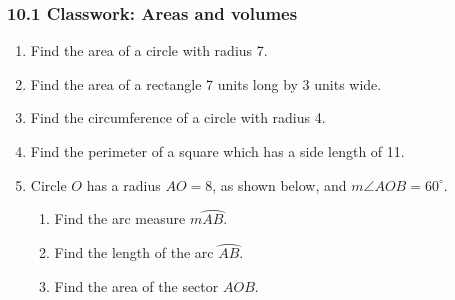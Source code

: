\documentclass[12pt, twoside]{article}
\begin{document}
\subsubsection*{10.1 Classwork: Areas and volumes}
 \begin{enumerate}

   \item Find the area of a circle with radius 7. \vspace{1.5cm}
   \item Find the area of a rectangle 7 units long by 3 units wide. \vspace{1.5cm}
   \item Find the circumference of a circle with radius 4. \vspace{1.5cm}
   \item Find the perimeter of a square which has a side length of 11. \vspace{1.5cm}

   \item Circle $O$ has a radius $AO=8$, as shown below, and $m\angle AOB=60^\circ$.
         \begin{center}
       \end{center}
       \begin{enumerate}
         \item Find the arc measure $m \wideparen{AB}$. \vspace{1.5cm}
         \item Find the length of the arc $\wideparen{AB}$. \vspace{1.5cm}
         \item Find the area of the sector $AOB$. %
       \end{enumerate}

\newpage


\end{enumerate}
\end{document}
